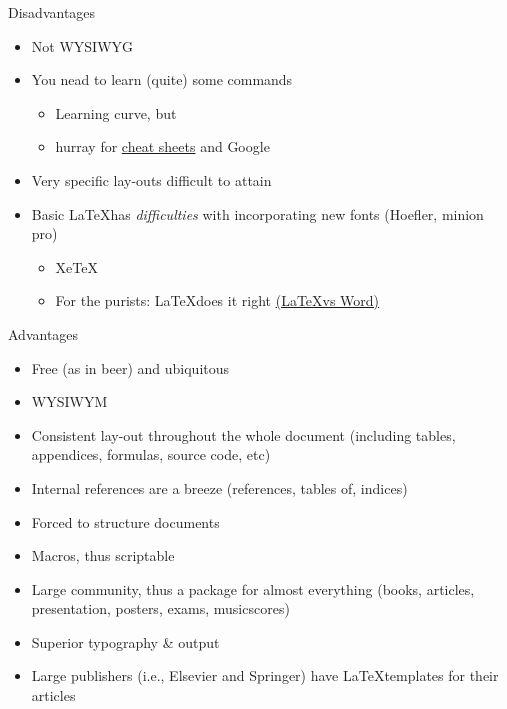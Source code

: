 \documentclass[ignorenonframetext,]{beamer}
\begin{document}
\begin{frame}{Disadvantages}

\begin{itemize}
\item
  Not WYSIWYG
\item
  You nead to learn (quite) some commands

  \begin{itemize}
  \itemsep1pt\parskip0pt
  \item
    Learning curve, but
  \item
    hurray for
    \href{http://www.stdout.org/~winston/latex/latexsheet-a4.pdf}{cheat
    sheets} and Google
  \end{itemize}
\item
  Very specific lay-outs difficult to attain
\item
  Basic \LaTeX has \emph{difficulties} with incorporating new fonts
  (Hoefler, minion pro)

  \begin{itemize}
  \itemsep1pt\parskip0pt
  \item
    XeTeX
  \item
    For the purists: \LaTeX does it right
    \href{http://oestrem.com/thingstwice/2007/05/latex-vs-word-vs-writer/}{(\LaTeX vs
    Word)}
  \end{itemize}
\end{itemize}

\end{frame}

\begin{frame}{Advantages}

\begin{itemize}
\itemsep1pt\parskip0pt
\item
  Free (as in beer) and ubiquitous
\item
  WYSIWYM
\item
  Consistent lay-out throughout the whole document (including tables,
  appendices, formulas, source code, etc)
\item
  Internal references are a breeze (references, tables of, indices)
\item
  Forced to structure documents
\item
  Macros, thus scriptable
\item
  Large community, thus a package for almost everything (books,
  articles, presentation, posters, exams, musicscores)
\item
  Superior typography \& output
\item
  Large publishers (i.e., Elsevier and Springer) have \LaTeX templates
  for their articles
\end{itemize}

\end{frame}
\end{document}
